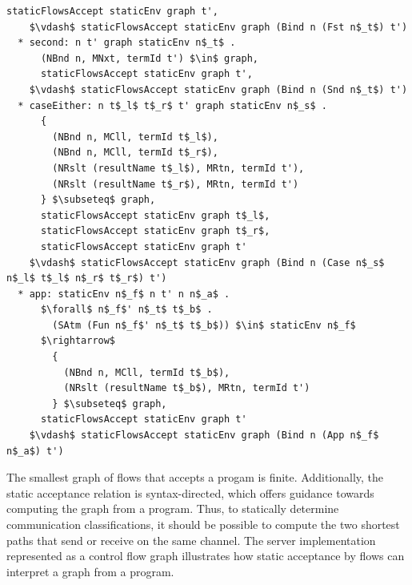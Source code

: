 \documentclass[letterpaper, 11pt]{extarticle}
\begin{document}
\begin{lstlisting}[language=logic, mathescape]
      staticFlowsAccept staticEnv graph t', 
    $\vdash$ staticFlowsAccept staticEnv graph (Bind n (Fst n$_t$) t')
  * second: n t' graph staticEnv n$_t$ .
      (NBnd n, MNxt, termId t') $\in$ graph, 
      staticFlowsAccept staticEnv graph t', 
    $\vdash$ staticFlowsAccept staticEnv graph (Bind n (Snd n$_t$) t')
  * caseEither: n t$_l$ t$_r$ t' graph staticEnv n$_s$ .
      {
        (NBnd n, MCll, termId t$_l$),
        (NBnd n, MCll, termId t$_r$),
        (NRslt (resultName t$_l$), MRtn, termId t'),
        (NRslt (resultName t$_r$), MRtn, termId t')
      } $\subseteq$ graph, 
      staticFlowsAccept staticEnv graph t$_l$, 
      staticFlowsAccept staticEnv graph t$_r$,
      staticFlowsAccept staticEnv graph t'
    $\vdash$ staticFlowsAccept staticEnv graph (Bind n (Case n$_s$ n$_l$ t$_l$ n$_r$ t$_r$) t')
  * app: staticEnv n$_f$ n t' n n$_a$ .
      $\forall$ n$_f$' n$_t$ t$_b$ . 
        (SAtm (Fun n$_f$' n$_t$ t$_b$)) $\in$ staticEnv n$_f$ 
      $\rightarrow$
        {
          (NBnd n, MCll, termId t$_b$),
          (NRslt (resultName t$_b$), MRtn, termId t')
        } $\subseteq$ graph,
      staticFlowsAccept staticEnv graph t'
    $\vdash$ staticFlowsAccept staticEnv graph (Bind n (App n$_f$ n$_a$) t')
\end{lstlisting}

The smallest graph of flows that accepts a progam is finite.  Additionally, the static
acceptance relation is syntax-directed, which offers guidance towards computing the graph
from a program. Thus, to statically determine communication classifications, it should
be possible to compute the two shortest paths that send or receive on the same channel. 
The server implementation represented as a control flow graph
illustrates how static acceptance by flows can interpret a graph from a program.
\end{document}
